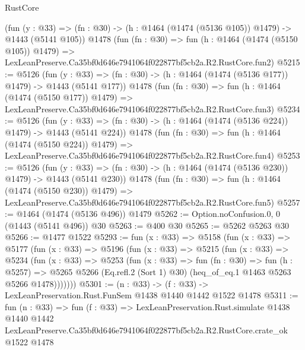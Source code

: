 \begin{lexlean}{RustCore}
\begin{coremodule}
    (fun (y : @33) => (fn : @30) -> (h : @1464 (@1474 (@5136 @105)) @1479) -> @1443 (@5141 @105))
    @1478
    (fun (fn : @30) =>
    fun (h : @1464 (@1474 (@5150 @105)) @1479) =>
    LexLeanPreserve.Ca35bf0d646e7941064f022877bf5cb2a.R2.RustCore.fun2)
@5215 := @5126
    (fun (y : @33) => (fn : @30) -> (h : @1464 (@1474 (@5136 @177)) @1479) -> @1443 (@5141 @177))
    @1478
    (fun (fn : @30) =>
    fun (h : @1464 (@1474 (@5150 @177)) @1479) =>
    LexLeanPreserve.Ca35bf0d646e7941064f022877bf5cb2a.R2.RustCore.fun3)
@5234 := @5126
    (fun (y : @33) => (fn : @30) -> (h : @1464 (@1474 (@5136 @224)) @1479) -> @1443 (@5141 @224))
    @1478
    (fun (fn : @30) =>
    fun (h : @1464 (@1474 (@5150 @224)) @1479) =>
    LexLeanPreserve.Ca35bf0d646e7941064f022877bf5cb2a.R2.RustCore.fun4)
@5253 := @5126
    (fun (y : @33) => (fn : @30) -> (h : @1464 (@1474 (@5136 @230)) @1479) -> @1443 (@5141 @230))
    @1478
    (fun (fn : @30) =>
    fun (h : @1464 (@1474 (@5150 @230)) @1479) =>
    LexLeanPreserve.Ca35bf0d646e7941064f022877bf5cb2a.R2.RustCore.fun5)
@5257 := @1464 (@1474 (@5136 @496)) @1479
@5262 := Option.noConfusion.{0, 0} (@1443 (@5141 @496)) @30
@5263 := @400 @30
@5265 := @5262 @5263 @30
@5266 := @1477 @1522
@5293 := fun (x : @33) =>
  @5158
    (fun (x : @33) =>
    @5177
      (fun (x : @33) =>
      @5196
        (fun (x : @33) =>
        @5215
          (fun (x : @33) =>
          @5234
            (fun (x : @33) =>
            @5253
              (fun (x : @33) =>
              fun (fn : @30) =>
              fun (h : @5257) =>
              @5265 @5266 (Eq.refl.{2} (Sort 1) @30) (heq_of_eq.{1} @1463 @5263 @5266 @1478)))))))
@5301 := (n : @33) -> (f : @33) -> LexLeanPreservation.Rust.FunSem @1438 @1440 @1442 @1522 @1478
@5311 := fun (n : @33) =>
  fun (f : @33) =>
  LexLeanPreservation.Rust.simulate
    @1438
    @1440
    @1442
    LexLeanPreserve.Ca35bf0d646e7941064f022877bf5cb2a.R2.RustCore.crate_ok
    @1522
    @1478
\end{coremodule}
\end{lexlean}
